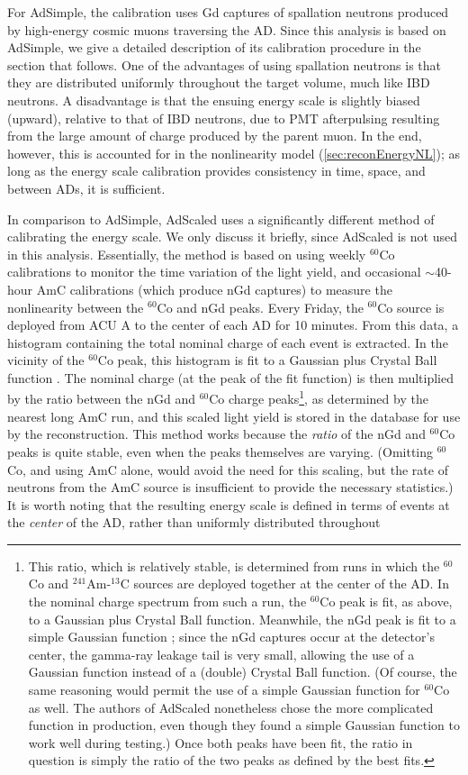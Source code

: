 \documentclass[../thesis.tex]{subfiles}
\begin{document}
For AdSimple, the calibration uses Gd captures of spallation neutrons produced by high-energy cosmic muons traversing the AD. Since this analysis is based on AdSimple, we give a detailed description of its calibration procedure in the section that follows. One of the advantages of using spallation neutrons is that they are distributed uniformly throughout the target volume, much like IBD neutrons. A disadvantage is that the ensuing energy scale is slightly biased (upward), relative to that of IBD neutrons, due to PMT afterpulsing resulting from the large amount of charge produced by the parent muon. In the end, however, this is accounted for in the nonlinearity model (\autoref{sec:reconEnergyNL}); as long as the energy scale calibration provides consistency in time, space, and between ADs, it is sufficient.

In comparison to AdSimple, AdScaled uses a significantly different method of calibrating the energy scale. We only discuss it briefly, since AdScaled is not used in this analysis. Essentially, the method is based on using weekly $^{60}$Co calibrations to monitor the time variation of the light yield, and occasional $\sim$40-hour AmC calibrations (which produce nGd captures) to measure the nonlinearity between the $^{60}$Co and nGd peaks. Every Friday, the $^{60}$Co source is deployed from ACU A to the center of each AD for 10 minutes. From this data, a histogram containing the total nominal charge of each event is extracted. In the vicinity of the $^{60}$Co peak, this histogram is fit to a Gaussian plus Crystal Ball function \cite{adScaledTechnote}. The nominal charge (at the peak of the fit function) is then multiplied by the ratio between the nGd and $^{60}$Co charge peaks\footnote{This ratio, which is relatively stable, is determined from runs in which the $^{60}$Co and $^{241}$Am-$^{13}$C sources are deployed together at the center of the AD. In the nominal charge spectrum from such a run, the $^{60}$Co peak is fit, as above, to a Gaussian plus Crystal Ball function. Meanwhile, the nGd peak is fit to a simple Gaussian function \cite{adScaledTechnote}; since the nGd captures occur at the detector's center, the gamma-ray leakage tail is very small, allowing the use of a Gaussian function instead of a (double) Crystal Ball function. (Of course, the same reasoning would permit the use of a simple Gaussian function for $^{60}$Co as well. The authors of AdScaled nonetheless chose the more complicated function in production, even though they found a simple Gaussian function to work well during testing.) Once both peaks have been fit, the ratio in question is simply the ratio of the two peaks as defined by the best fits.}, as determined by the nearest long AmC run, and this scaled light yield is stored in the database for use by the reconstruction. This method works because the \emph{ratio} of the nGd and $^{60}$Co peaks is quite stable, even when the peaks themselves are varying. (Omitting $^{60}$Co, and using AmC alone, would avoid the need for this scaling, but the rate of neutrons from the AmC source is insufficient to provide the necessary statistics.) It is worth noting that the resulting energy scale is defined in terms of events at the \emph{center} of the AD, rather than uniformly distributed throughout 
\end{document}

